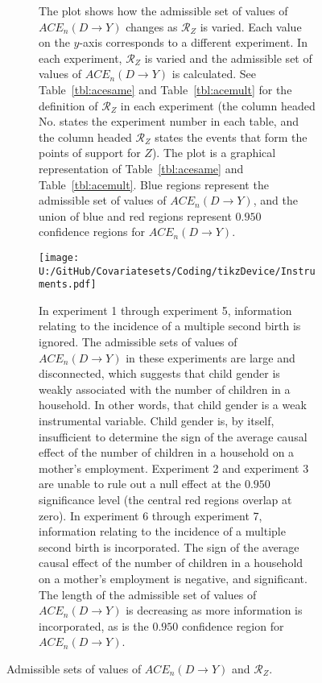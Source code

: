 \documentclass[10pt,a4paper,twoside]{article}
\numberwithin{equation}{section}
\begin{document}
\begin{figure}[p]
\centering
\begin{subfigure}{0.8\textwidth}
\caption{The plot shows how the admissible set of values of $ACE_n(D\rightarrow Y)$ changes as $\mathcal{R}_Z$ is varied. Each value on the $y$-axis corresponds to a different experiment. In each experiment, $\mathcal{R}_Z$ is varied and the admissible set of values of $ACE_n(D\rightarrow Y)$ is calculated. See Table~\ref{tbl:acesame} and Table~\ref{tbl:acemult} for the definition of $\mathcal{R}_Z$ in each experiment (the column headed No. states the experiment number in each table, and the column headed $\mathcal{R}_Z$ states the events that form the points of support for $Z$). The plot is a graphical representation of Table~\ref{tbl:acesame} and Table~\ref{tbl:acemult}. Blue regions represent the admissible set of values of $ACE_n(D\rightarrow Y)$, and the union of blue and red regions represent $0.950$ confidence regions for $ACE_n(D\rightarrow Y)$.}
\texttt{[image: U:/GitHub/Covariatesets/Coding/tikzDevice/Instruments.pdf]}
\caption{In experiment 1 through experiment 5, information relating to the incidence of a multiple second birth is ignored. The admissible sets of values of $ACE_n(D\rightarrow Y)$ in these experiments are large and disconnected, which suggests that child gender is weakly associated with the number of children in a household. In other words, that child gender is a weak instrumental variable. Child gender is, by itself, insufficient to determine the sign of the average causal effect of the number of children in a household on a mother's employment. Experiment 2 and experiment 3 are unable to rule out a null effect at the $0.950$ significance level (the central red regions overlap at zero). In experiment 6 through experiment 7, information relating to the incidence of a multiple second birth is incorporated. The sign of the average causal effect of the number of children in a household on a mother's employment is negative, and significant. The length of the admissible set of values of $ACE_n(D\rightarrow Y)$ is decreasing as more information is incorporated, as is the $0.950$ confidence region for $ACE_n(D\rightarrow Y)$.}
\end{subfigure}
\caption{Admissible sets of values of $ACE_n(D\rightarrow Y)$ and $\mathcal{R}_Z$.}
\label{fig:experiments}
\end{figure}
\end{document}
